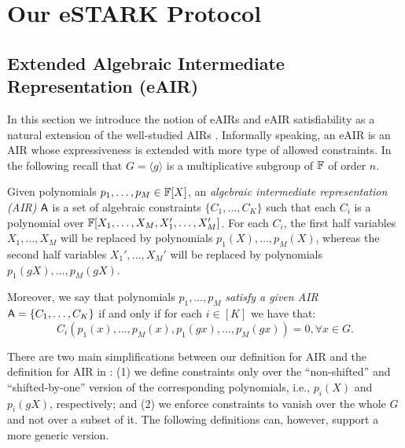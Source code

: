 

\section{Our eSTARK Protocol}\label{sec:generic-description}

\subsection{Extended Algebraic Intermediate Representation (eAIR)}

In this section we introduce the notion of eAIRs and eAIR satisfiability as a natural extension of the well-studied AIRs \cite{C:BBHR19}. Informally speaking, an eAIR is an AIR whose expressiveness is extended with more type of allowed constraints. In the following recall that $G = \langle g \rangle$ is a multiplicative subgroup of $\mathbb{F}$ of order $n$.

\begin{definition}\label{def:AIR}
  Given polynomials $p_1,\dots,p_M \in \mathbb{F}[X]$, an \textit{algebraic intermediate representation (AIR)} $\textsf{A}$ is a set of algebraic constraints $\{C_1,\dots,C_K\}$ such that each $C_i$ is a polynomial over $\mathbb{F}[X_1,\dots,X_M,X_1',\dots,X_M']$. For each $C_i$, the first half variables $X_1,\dots,X_M$ will be replaced by polynomials $p_1(X),\dots,p_M(X)$, whereas the second half variables $X_1',\dots,X_M'$ will be replaced by polynomials $p_1(gX),\dots,p_M(gX)$.

  Moreover, we say that polynomials $p_1,\dots,p_M$ \textit{satisfy a given AIR} $\textsf{A} = \{C_1,\dots,C_K\}$ if and only if for each $i \in [K]$ we have that:
  \[
    C_i(p_1(x),\dots,p_M(x),p_1(gx),\dots,p_M(gx)) = 0, \forall x \in G.
  \]
\end{definition}
\begin{bremark}
  There are two main simplifications between our definition for AIR and the definition for AIR in \cite{EPRINT:StarkWare21}: (1) we define constraints only over the ``non-shifted'' and ``shifted-by-one'' version of the corresponding polynomials, i.e., $p_i(X)$ and $p_i(gX)$, respectively; and (2) we enforce constraints to vanish over the whole $G$ and not over a subset of it. The following definitions can, however, support a more generic version. 
\end{bremark}

